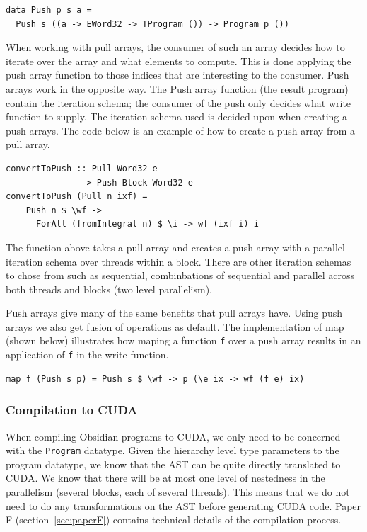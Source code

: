 \documentclass[a4paper]{book}
\begin{document}
\begin{verbatim}
data Push p s a =
  Push s ((a -> EWord32 -> TProgram ()) -> Program p ())
\end{verbatim} 

When working with pull arrays, the consumer of such an array decides how to 
iterate over the array and what elements to compute. This is done applying the 
push array function to those indices that are interesting to the consumer. Push 
arrays work in the opposite way. The Push array function (the result program) contain 
the iteration schema; the consumer of the push only decides what write function 
to supply. The iteration schema used is decided upon when creating a push arrays. 
The code below is an example of how to create a push array from a pull array.

\begin{verbatim} 
convertToPush :: Pull Word32 e 
               -> Push Block Word32 e 
convertToPush (Pull n ixf) =
    Push n $ \wf -> 
      ForAll (fromIntegral n) $ \i -> wf (ixf i) i
\end{verbatim} 

The function above takes a pull array and creates a push array with a parallel 
iteration schema over threads within a block. There are other iteration schemas to 
chose from such as sequential, combinbations of sequential and parallel
across both threads and blocks (two level parallelism). 

Push arrays give many of the same benefits that pull arrays have. Using push 
arrays we also get fusion of operations as default. The implementation of map 
(shown below) illustrates how maping a function {\tt f} over a push array results 
in an application of {\tt f} in the write-function. 

\begin{verbatim} 
map f (Push s p) = Push s $ \wf -> p (\e ix -> wf (f e) ix)
\end{verbatim}

\subsubsection{Compilation to CUDA}

When compiling Obsidian programs to CUDA, we only need to be concerned with the 
{\tt Program} datatype. Given the hierarchy level type parameters to the program datatype, 
we know that the AST can be quite directly translated to CUDA. We know that there will 
be at most one level of nestedness in the parallelism (several blocks, each of several threads). 
This means that we do not need to do any transformations on the AST before generating CUDA code. 
Paper F (section~\ref{sec:paperF}) contains technical details of the compilation process. 
\end{document}
